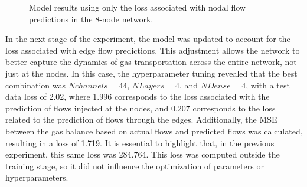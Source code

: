 %
%

%

\begin{figure}
    \centering
    \setlength{}        
    \setlength{} 
    
    \caption{Model results using only the loss associated with nodal flow predictions in the 8-node network.}
    \label{fig:dummy_base_results}
\end{figure}

In the next stage of the experiment, the model was updated to account for the loss associated with edge flow predictions. This adjustment allows the network to better capture the dynamics of gas transportation across the entire network, not just at the nodes. In this case, the hyperparameter tuning revealed that the best combination was $N channels=44$, $N Layers=4$, and $N Dense=4$, with a test data loss of 2.02, where 1.996 corresponds to the loss associated with the prediction of flows injected at the nodes, and 0.207 corresponds to the loss related to the prediction of flows through the edges. Additionally, the MSE between the gas balance based on actual flows and predicted flows was calculated, resulting in a loss of 1.719. It is essential to highlight that, in the previous experiment, this same loss was 284.764. This loss was computed outside the training stage, so it did not influence the optimization of parameters or hyperparameters.


